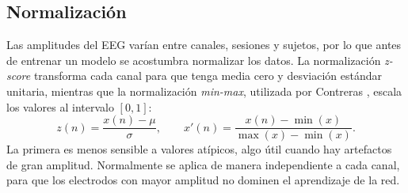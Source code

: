 \subsection{Normalización}

Las amplitudes del EEG varían entre canales, sesiones y sujetos, por lo que antes de entrenar un
modelo se acostumbra normalizar los datos. La normalización \textit{z-score} transforma cada canal
para que tenga media cero y desviación estándar unitaria, mientras que la normalización
\textit{min-max}, utilizada por Contreras \cite{contreras2021}, escala los valores al intervalo
$[0,1]$:
\begin{equation}
z(n) = \frac{x(n)-\mu}{\sigma}, \qquad
x'(n) = \frac{x(n)-\min(x)}{\max(x)-\min(x)}.
\label{eq:normalizacion}
\end{equation}
La primera es menos sensible a valores atípicos, algo útil cuando hay artefactos de gran amplitud.
Normalmente se aplica de manera independiente a cada canal, para que los electrodos con mayor
amplitud no dominen el aprendizaje de la red.

